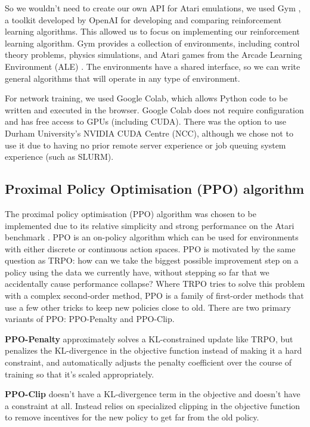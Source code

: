 \documentclass[12pt,a4paper]{article}
\begin{document}
So we wouldn't need to create our own API for Atari emulations, we used Gym \cite{1606.01540}, a toolkit developed by OpenAI for developing and comparing reinforcement learning algorithms. This allowed us to focus on implementing our reinforcement learning algorithm. Gym provides a collection of environments, including control theory problems, physics simulations, and Atari games from the Arcade Learning Environment (ALE) \cite{bellemare13arcade}. The environments have a shared interface, so we can write general algorithms that will operate in any type of environment.

For network training, we used Google Colab, which allows Python code to be written and executed in the browser. Google Colab does not require configuration and has free access to GPUs (including CUDA). There was the option to use Durham University's NVIDIA CUDA Centre (NCC), although we chose not to use it due to having no prior remote server experience or job queuing system experience (such as SLURM).

\subsection{Proximal Policy Optimisation (PPO) algorithm}
The proximal policy optimisation (PPO) algorithm was chosen to be implemented due to its relative simplicity and strong performance on the Atari benchmark \cite{DBLP:journals/corr/SchulmanWDRK17}. PPO is an on-policy algorithm which can be used for environments with either discrete or continuous action spaces. PPO is motivated by the same question as TRPO: how can we take the biggest possible improvement step on a policy using the data we currently have, without stepping so far that we accidentally cause performance collapse? Where TRPO tries to solve this problem with a complex second-order method, PPO is a family of first-order methods that use a few other tricks to keep new policies close to old. There are two primary variants of PPO: PPO-Penalty and PPO-Clip.

\textbf{PPO-Penalty} approximately solves a KL-constrained update like TRPO, but penalizes the KL-divergence in the objective function instead of making it a hard constraint, and automatically adjusts the penalty coefficient over the course of training so that it’s scaled appropriately.

\textbf{PPO-Clip} doesn’t have a KL-divergence term in the objective and doesn’t have a constraint at all. Instead relies on specialized clipping in the objective function to remove incentives for the new policy to get far from the old policy.
\end{document}
